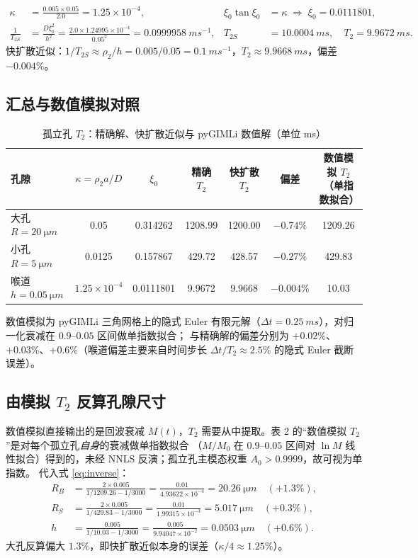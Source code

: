 \documentclass[11pt,a4paper]{article}
\newcommand{\Ts}{T_{2S}}
\begin{document}
\begin{align*}
\kappa&=\frac{0.005\times0.05}{2.0}=1.25\times10^{-4},
&\xi_0\tan\xi_0&=\kappa\;\Rightarrow\;\xi_0=0.0111801,\\
\frac{1}{\Ts}&=\frac{D\xi_0^{2}}{h^{2}}=\frac{2.0\times1.24995\times10^{-4}}{0.05^{2}}=\SI{0.0999958}{ms^{-1}},
&\Ts&=\SI{10.0004}{ms},\quad T_2=\SI{9.9672}{ms}.
\end{align*}
快扩散近似：$1/\Ts\approx\rho_2/h=0.005/0.05=\SI{0.1}{ms^{-1}}$，$T_2\approx\SI{9.9668}{ms}$，偏差 $-0.004\%$。

\subsection{汇总与数值模拟对照}

\begin{table}[h]
\centering
\caption{孤立孔 $T_2$：精确解、快扩散近似与 pyGIMLi 数值解（单位 ms）}
\begin{tabular}{lcccccc}
\toprule
孔隙 & $\kappa=\rho_2a/D$ & $\xi_0$ & 精确 $T_2$ & 快扩散 $T_2$ & 偏差 & \shortstack{数值模拟 $T_2$\\（单指数拟合）} \\
\midrule
大孔 $R=\SI{20}{\micro m}$ & 0.05 & 0.314262 & 1208.99 & 1200.00 & $-0.74\%$ & 1209.26 \\
小孔 $R=\SI{5}{\micro m}$ & 0.0125 & 0.157867 & 429.72 & 428.57 & $-0.27\%$ & 429.83 \\
喉道 $h=\SI{0.05}{\micro m}$ & $1.25\times10^{-4}$ & 0.0111801 & 9.9672 & 9.9668 & $-0.004\%$ & 10.03 \\
\bottomrule
\end{tabular}
\end{table}

数值模拟为 pyGIMLi 三角网格上的隐式 Euler 有限元解（$\Delta t=\SI{0.25}{ms}$），对归一化衰减在 $0.9$–$0.05$ 区间做单指数拟合；
与精确解的偏差分别为 $+0.02\%$、$+0.03\%$、$+0.6\%$（喉道偏差主要来自时间步长 $\Delta t/T_2\approx2.5\%$ 的隐式 Euler 截断误差）。

\subsection{由模拟 $T_2$ 反算孔隙尺寸}

数值模拟直接输出的是回波衰减 $M(t)$，$T_2$ 需要从中提取。表 2 的“数值模拟 $T_2$”是对每个孤立孔\emph{自身}的衰减做单指数拟合
（$M/M_0$ 在 $0.9$–$0.05$ 区间对 $\ln M$ 线性拟合）得到的，未经 NNLS 反演；孤立孔主模态权重 $A_0>0.9999$，故可视为单指数。
代入式 \eqref{eq:inverse}：
\begin{align*}
R_B&=\frac{2\times0.005}{1/1209.26-1/3000}=\frac{0.01}{4.93622\times10^{-4}}=\SI{20.26}{\micro m}\quad(+1.3\%),\\
R_S&=\frac{2\times0.005}{1/429.83-1/3000}=\frac{0.01}{1.99315\times10^{-3}}=\SI{5.017}{\micro m}\quad(+0.3\%),\\
h&=\frac{0.005}{1/10.03-1/3000}=\frac{0.005}{9.94047\times10^{-2}}=\SI{0.0503}{\micro m}\quad(+0.6\%).
\end{align*}
大孔反算偏大 $1.3\%$，即快扩散近似本身的误差（$\kappa/4\approx1.25\%$）。
\end{document}
